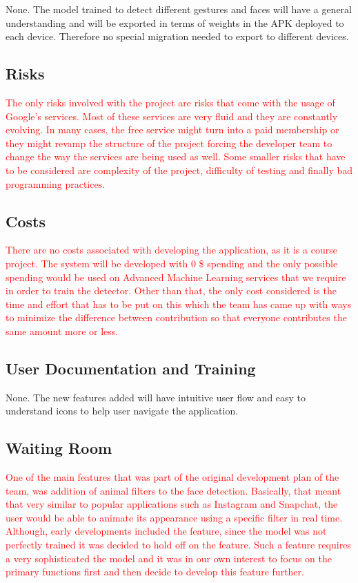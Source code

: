 \documentclass[12pt, titlepage]{article}
\begin{document}
None. The model trained to detect different gestures and faces will have a general understanding and will be exported in terms of weights in the APK deployed to each device. Therefore no special migration needed to export to different devices. 

\subsection{Risks}

\textcolor{red}{The only risks involved with the project are risks that come with the usage of Google’s services. Most of these services are very fluid and they are constantly evolving. In many cases, the free service might turn into a paid membership or they might revamp the structure of the project forcing the developer team to change the way the services are being used as well. Some smaller risks that have to be considered are complexity of the project, difficulty of testing and finally bad programming practices. }

\subsection{Costs}

\textcolor{red}{There are no costs associated with developing the application, as it is a course project. The system will be developed with 0 \$ spending and the only possible spending would be used on Advanced Machine Learning services that we require in order to train the detector. Other than that, the only cost considered is the time and effort that has to be put on this which the team has came up with ways to minimize the difference between contribution so that everyone contributes the same amount more or less. }

\subsection{User Documentation and Training}

None. The new features added will have intuitive user flow and easy to understand icons to help user navigate the application.

\subsection{Waiting Room}

\textcolor{red}{One of the main features that was part of the original development plan of the team, was addition of animal filters to the face detection. Basically, that meant that very similar to popular applications such as Instagram and Snapchat, the user would be able to animate its appearance using a specific filter in real time. Although, early developments included the feature, since the model was not perfectly trained it was decided to hold off on the feature. Such a feature requires a very sophisticated the model and it was in our own interest to focus on the primary functions first and then decide to develop this feature further.}
\end{document}
